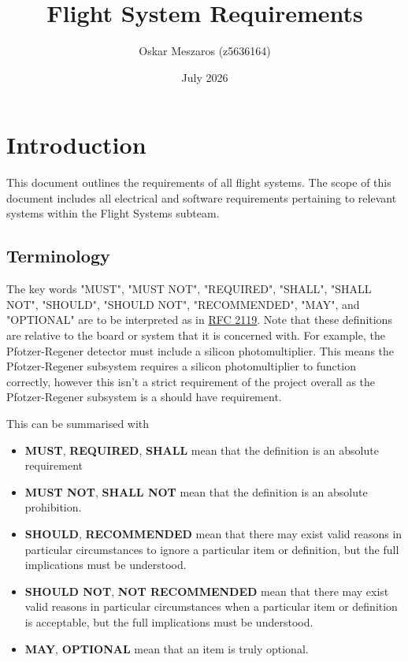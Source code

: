 \documentclass{article}
\title{Flight System Requirements}
\author{Oskar Meszaros (z5636164)}
\date{July 2026}
\begin{document}
\maketitle
\tableofcontents
\newpage

\section{Introduction}
This document outlines the requirements of all flight systems. The scope of this document includes all electrical and software requirements pertaining to relevant systems within the Flight Systems subteam.

\subsection{Terminology}
The key words "MUST", "MUST NOT", "REQUIRED", "SHALL", "SHALL NOT", "SHOULD", "SHOULD NOT", "RECOMMENDED", "MAY", and "OPTIONAL" are to be interpreted as in \href{https://datatracker.ietf.org/doc/html/rfc2119}{RFC 2119}. Note that these definitions are relative to the board or system that it is concerned with. For example, the Pfotzer-Regener detector must include a silicon photomultiplier. This means the Pfotzer-Regener subsystem requires a silicon photomultiplier to function correctly, however this isn't a strict requirement of the project overall as the Pfotzer-Regener subsystem is a should have requirement.

This can be summarised with
\begin{itemize}
    \item \textbf{MUST}, \textbf{REQUIRED}, \textbf{SHALL} mean that the definition is an absolute requirement
    \item \textbf{MUST NOT}, \textbf{SHALL NOT} mean that the definition is an absolute prohibition.
    \item \textbf{SHOULD}, \textbf{RECOMMENDED} mean that there may exist valid reasons in particular circumstances to ignore a particular item or definition, but the full implications must be understood.
    \item \textbf{SHOULD NOT}, \textbf{NOT RECOMMENDED} mean that there may exist valid reasons in particular circumstances when a particular item or definition is acceptable, but the full implications must be understood.
    \item \textbf{MAY}, \textbf{OPTIONAL} mean that an item is truly optional.
\end{itemize}
\end{document}

